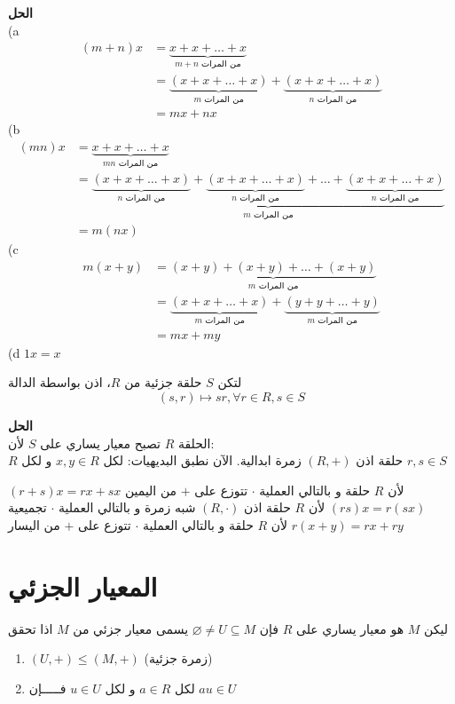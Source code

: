 \noindent
	\textbf{الحل}\\
	\noindent
	(a
	\begin{align*}
		(m+n) x &= \underbrace{x+x+\dots+x}_{\text{$m+n$ من المرات}}\\
		&= \underbrace{(x+x+\dots+x)}_{\text{$m$ من المرات}} +  \underbrace{(x+x+\dots+x)}_{\text{$n$ من المرات}} \\
		&= mx+nx
	\end{align*}
	(b
	\begin{align*}
		(mn)x &= \underbrace{x+x+\dots+x}_{\text{$mn$ من المرات}}\\
		&= \underbrace{
		\underbrace{(x+x+\dots+x)}_{\text{$n$ من المرات}} + \underbrace{(x+x+\dots+x)}_{\text{$n$ من المرات}} + \dots + \underbrace{(x+x+\dots+x)}_{\text{$n$ من المرات}}
		}_{\text{$m$ من المرات}}\\
		&= m(nx)
	\end{align*}
	(c
	\begin{align*}
		m(x+y) &= \underbrace{(x+y)+(x+y)+\dots+(x+y)}_{\text{$m$ من المرات}}\\
		&= \underbrace{(x+x+\dots+x)}_{\text{$m$ من المرات}} + \underbrace{(y+y+\dots+y)}_{\text{$m$ من المرات}} \\
		&= mx+ my
	\end{align*}
	(d $1x = x$
	\begin{example}
		لتكن $S$ حلقة جزئية من $R$، اذن بواسطة الدالة
		\[
		(s,r) \mapsto sr, \forall r\in R , s\in S
		\]
	\end{example}
	\noindent
	\textbf{الحل}\\
	\noindent
	الحلقة $R$ تصبح معيار يساري على $S$ لأن:\\
	 	$R$ حلقة اذن $(R,+)$ زمرة ابدالية. الآن نطبق البديهيات: لكل $x,y\in R$ و لكل $r,s\in S$
	\begin{tasks}
			\task $(r+s)x=rx+sx$ لأن $R$ حلقة و بالتالي العملية $\cdot$ تتوزع على $+$ من اليمين
		\task $(rs)x=r(sx)$ لأن $R$ حلقة اذن $(R,\cdot)$ شبه زمرة و بالتالي العملية $\cdot$ تجميعية
		\task $r(x+y) = rx+ry$ لأن $R$ حلقة و بالتالي العملية $\cdot$ تتوزع على $+$ من اليسار
	\end{tasks}

\section{المعيار الجزئي}
\begin{definition}
  ليكن $M$ هو معيار يساري على $R$ فإن $\varnothing\neq U\subseteq M$ يسمى معيار جزئي من $M$ اذا تحقق
  \begin{enumerate}
  	\item $(U, +) \leq (M, +)$ (زمرة جزئية)
  	\item  لكل $a\in R$ و لكل $u\in U$ فـــــإن $au\in U$
  \end{enumerate}
\end{definition}


